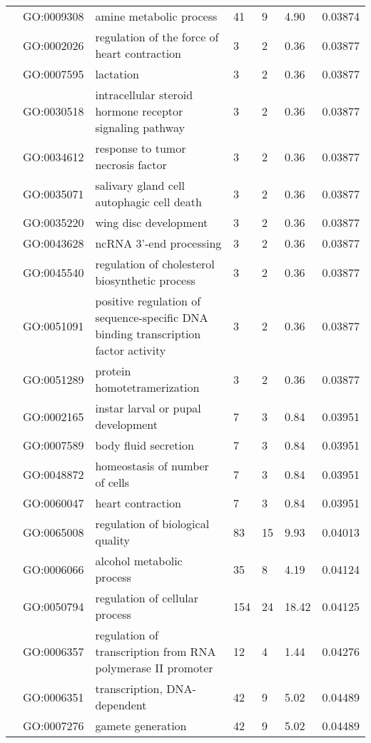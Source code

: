 \documentclass[10pt]{bmc_article}
\newenvironment{bmcformat}{\begin{raggedright}\baselineskip20pt\sloppy\setboolean{publ}{false}}{\end{raggedright}\baselineskip20pt\sloppy}
\begin{document}
\begin{bmcformat}
\begin{longtable}{p{1.7cm}lp{4.5cm}p{1cm}p{1cm}ll}
   & GO:0009308 & amine metabolic process &  41 &   9 & 4.90 & 0.03874 \\ 
   & GO:0002026 & regulation of the force of heart contraction &   3 &   2 & 0.36 & 0.03877 \\ 
   & GO:0007595 & lactation &   3 &   2 & 0.36 & 0.03877 \\ 
   & GO:0030518 & intracellular steroid hormone receptor signaling pathway &   3 &   2 & 0.36 & 0.03877 \\ 
   & GO:0034612 & response to tumor necrosis factor &   3 &   2 & 0.36 & 0.03877 \\ 
   & GO:0035071 & salivary gland cell autophagic cell death &   3 &   2 & 0.36 & 0.03877 \\ 
   & GO:0035220 & wing disc development &   3 &   2 & 0.36 & 0.03877 \\ 
   & GO:0043628 & ncRNA 3'-end processing &   3 &   2 & 0.36 & 0.03877 \\ 
   & GO:0045540 & regulation of cholesterol biosynthetic process &   3 &   2 & 0.36 & 0.03877 \\ 
   & GO:0051091 & positive regulation of sequence-specific DNA binding transcription factor activity &   3 &   2 & 0.36 & 0.03877 \\ 
   & GO:0051289 & protein homotetramerization &   3 &   2 & 0.36 & 0.03877 \\ 
   & GO:0002165 & instar larval or pupal development &   7 &   3 & 0.84 & 0.03951 \\ 
   & GO:0007589 & body fluid secretion &   7 &   3 & 0.84 & 0.03951 \\ 
   & GO:0048872 & homeostasis of number of cells &   7 &   3 & 0.84 & 0.03951 \\ 
   & GO:0060047 & heart contraction &   7 &   3 & 0.84 & 0.03951 \\ 
   & GO:0065008 & regulation of biological quality &  83 &  15 & 9.93 & 0.04013 \\ 
   & GO:0006066 & alcohol metabolic process &  35 &   8 & 4.19 & 0.04124 \\ 
   & GO:0050794 & regulation of cellular process & 154 &  24 & 18.42 & 0.04125 \\ 
   & GO:0006357 & regulation of transcription from RNA polymerase II promoter &  12 &   4 & 1.44 & 0.04276 \\ 
   & GO:0006351 & transcription, DNA-dependent &  42 &   9 & 5.02 & 0.04489 \\ 
   & GO:0007276 & gamete generation &  42 &   9 & 5.02 & 0.04489 \\ 

\end{longtable}
\end{bmcformat}
\end{document}
